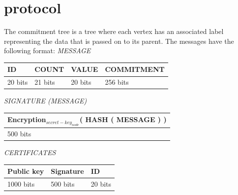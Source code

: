 \chapter{protocol}

	The commitment tree is a tree where each vertex has an associated label representing the data that is passed on to its parent. The messages have the following format: 
	\textit{MESSAGE}
	\newline
	
	\begin{tabular}{ | l | l | l | l |}
		\hline
		ID & COUNT & VALUE & COMMITMENT \\
		\hline
		20 bits & 21 bits & 20 bits & 256 bits\\
		\hline
	\end{tabular}
	\newline
	\newline
	\textit{SIGNATURE (MESSAGE)}
	\newline

	\begin{tabular}{ |l| }
		\hline
		Encryption$_{secret-key_{node}}$( HASH ( MESSAGE ) )\\
		\hline
		500 bits\\
		\hline
	\end{tabular}
	\newline
	\newline
	\textit{CERTIFICATES}
	\newline

	\begin{tabular}{ | l | l | l | }
		\hline
			Public key  & Signature & ID \\
		\hline
			1000 bits & 500 bits & 20 bits \\
		\hline

	\end{tabular}

	\newpage

